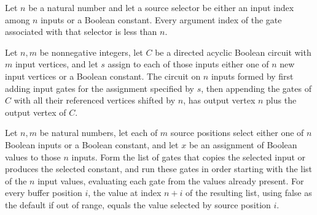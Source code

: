 \begin{theorem}
\label{BoolCircuit.inputGate_args_lt}
\leanok
{}
Let $n$ be a natural number and let a source selector be either an input index among $n$
inputs or a Boolean constant. Every argument index of the gate associated with that
selector is less than $n$.
\end{theorem}

\begin{definition}
\label{BoolCircuit.DAGCircuit.bufferInputs}
\leanok
{}
Let $n,m$ be nonnegative integers, let $C$ be a directed acyclic Boolean circuit with
$m$ input vertices, and let $s$ assign to each of those inputs either one of $n$ new
input vertices or a Boolean constant. The circuit on $n$ inputs formed by first adding
input gates for the assignment specified by $s$, then appending the gates of $C$ with
all their referenced vertices shifted by $n$, has output vertex $n$ plus the output
vertex of $C$.
\end{definition}

\begin{theorem}
\label{BoolCircuit.inputBuffer_value}
\leanok
{}
Let $n,m$ be natural numbers, let each of $m$ source positions select either one of $n$
Boolean inputs or a Boolean constant, and let $x$ be an assignment of Boolean values to
those $n$ inputs. Form the list of gates that copies the selected input or produces the
selected constant, and run these gates in order starting with the list of the $n$ input
values, evaluating each gate from the values already present. For every buffer position
$i$, the value at index $n+i$ of the resulting list, using false as the default if out
of range, equals the value selected by source position $i$.
\end{theorem}

